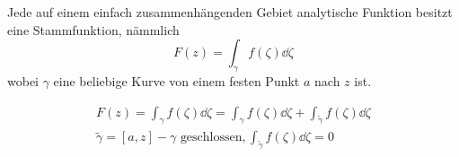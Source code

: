 \begin{folge}[note = Folgerung von Cauchy , index = Folgerung von Cauchy , indexformat = {3!12~}]
	Jede auf einem einfach zusammenhängenden Gebiet analytische Funktion besitzt eine Stammfunktion, nämmlich
	\[ F(z) = \int_\gamma f(\zeta) \dd \zeta \]
	wobei $\gamma$ eine beliebige Kurve von einem festen Punkt $a$ nach $z$ ist.
	\begin{bew}[note = für sternförmige Gebiete]
		\begin{gather*}
			F(z) = \int_\gamma f(\zeta) \dd \zeta = \int_\gamma f(\zeta) \dd \zeta + \int_{\tilde{\gamma}} f(\zeta) \dd \zeta \\
			\tilde{\gamma} = [a,z] - \gamma \text{ geschlossen} , \int_{\tilde{\gamma}} f(\zeta) \dd \zeta = 0
		\end{gather*}
	\end{bew}
\end{folge}
